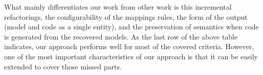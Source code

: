 What mainly differentiates our work from other work is this incremental refactorings, the configurability of the mappings rules, the form of the output (model and code as a single entity), and the preservation of semantics when code is generated from the recovered models. As the last row of the above table indicates, our approach performs well for most of the covered criteria. However, one of the most important characteristics of our approach is that it can be easily extended to cover those missed parts.